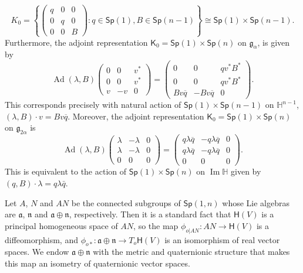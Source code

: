 \documentclass[12pt, a4paper]{amsart}
\newcommand{\g}{\mathfrak}
\newcommand{\Ad}{\operatorname{Ad}}
\renewcommand{\H}{\mathbb{H}}
\renewcommand{\Im}{\operatorname{Im}}
\newcommand{\Sp}{\mathsf{Sp}}
\theoremstyle{remark}
\begin{document}
\[
{K}_{0}=\left\{
	\left(
		\begin{array}{cc|c}
			q & 0 & 0 \\
			0 & q & 0 \\
			\hline
			0 & 0 & B
		\end{array}
	\right)\colon q\in\mathsf{Sp}(1),B\in\mathsf{Sp}(n-1)
\right\}
\cong\mathsf{Sp}(1)\times\mathsf{Sp}(n-1).
\]
Furthermore, the adjoint representation $\mathsf{K}_{0}=\Sp(1)\times\Sp(n)$ on $\g{g}_{\alpha}$, is given by
\[
\Ad(\lambda,B)\left(
\begin{array}{cc|c}
	0 & 0 & v^*\\
	0 & 0 & v^*\\
	\hline
	v & -v & 0
\end{array}
\right)
=\left(
\begin{array}{cc|c}
	0 & 0 & qv^*B^*\\
	0 & 0 & qv^*B^*\\
	\hline
	Bv\overline{q} & -Bv\overline{q} & 0
\end{array}
\right).
\]
This corresponds precisely with natural action of $\mathsf{Sp}(1)\times\mathsf{Sp}(n-1)$ on $\H^{n-1}$, $(\lambda,B)\cdot v=Bv\overline{q}$.
Moreover, the adjoint representation $\mathsf{K}_{0}=\Sp(1)\times\Sp(n)$ on $\g{g}_{2\alpha}$ is
\[
\Ad(\lambda,B)\left(
\begin{array}{cc|c}
	\lambda & -\lambda & 0\\
	\lambda & -\lambda & 0\\
	\hline
	0 & 0 & 0
\end{array}
\right)
=\left(
\begin{array}{cc|c}
	q\lambda\overline{q} & -q\lambda\overline{q} & 0\\
	q\lambda\overline{q} & -q\lambda\overline{q} & 0\\
	\hline
	0 & 0 & 0
\end{array}
\right).
\]
This is equivalent to the action of $\Sp(1)\times\Sp(n)$ on $\Im\H$ given by $(q,B)\cdot \lambda=q\lambda\bar{q}$.
	
Let ${A}$, ${N}$ and ${AN}$ be the connected subgroups of $\mathsf{Sp}(1,n)$ whose Lie algebras are $\g{a}$, $\g{n}$ and $\g{a}\oplus \g{n}$, respectively.
Then it is a standard fact that $\mathsf{H}(V)$ is a principal homogeneous space of ${AN}$, 
so the map $\phi_{o\vert AN}\colon AN\to \mathsf{H}(V)$ is a diffeomorphism,
and $\phi_{o*}\colon\g{a}\oplus\g{n}\to T_o\mathsf{H}(V)$ is an isomorphism of real vector spaces.
We endow $\g{a}\oplus\g{n}$ with the metric and quaternionic structure that makes this map an isometry of quaternionic vector spaces.
\end{document}
